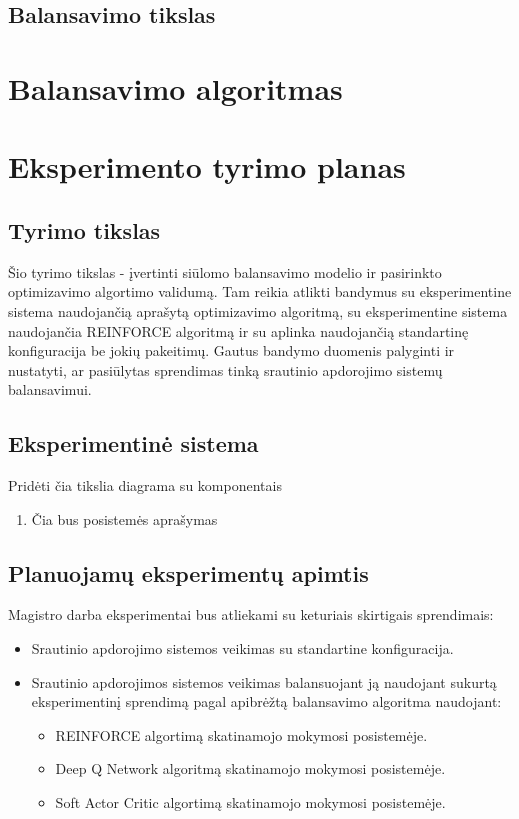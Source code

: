 \documentclass{VUMIFPSbakalaurinis}
\begin{document}
\subsection{Balansavimo tikslas}


\section{Balansavimo algoritmas}


\section{Eksperimento tyrimo planas}

\subsection{Tyrimo tikslas}

Šio tyrimo tikslas - įvertinti siūlomo balansavimo modelio ir pasirinkto optimizavimo algortimo validumą. Tam reikia atlikti bandymus su eksperimentine sistema naudojančią aprašytą optimizavimo algoritmą, su eksperimentine sistema naudojančia REINFORCE algoritmą ir su aplinka naudojančią standartinę konfiguracija be jokių pakeitimų. Gautus bandymo duomenis palyginti ir nustatyti, ar pasiūlytas sprendimas tinką srautinio apdorojimo sistemų balansavimui.

\subsection{Eksperimentinė sistema}


Pridėti čia tikslia diagrama su komponentais

\begin{enumerate}
    \item Čia bus posistemės aprašymas
\end{enumerate}


\subsection{Planuojamų eksperimentų apimtis}

Magistro darba eksperimentai bus atliekami su keturiais skirtigais sprendimais:
\begin{itemize}
    \item Srautinio apdorojimo sistemos veikimas su standartine konfiguracija.
    \item Srautinio apdorojimos sistemos veikimas balansuojant ją naudojant sukurtą eksperimentinį sprendimą pagal apibrėžtą balansavimo algoritma naudojant:
    \begin{itemize}
        \item REINFORCE algortimą skatinamojo mokymosi posistemėje.
        \item Deep Q Network algoritmą skatinamojo mokymosi posistemėje.
        \item Soft Actor Critic algortimą skatinamojo mokymosi posistemėje.
    \end{itemize}
\end{itemize}
\end{document}
